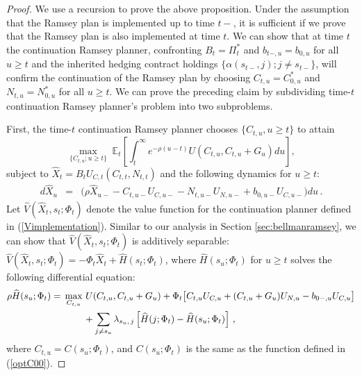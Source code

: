 \documentclass[12pt]{article}
\newcommand{\NW}[1]{{\textcolor{blue}{#1}}}
\newcommand{\WJ}[1]{{\textcolor{red}{#1}}}
\begin{document}
\begin{proof}
	We  use a  recursion to prove the above proposition. 
	Under the assumption that the Ramsey plan is implemented  up to time $t-$, it is sufficient if we prove that the Ramsey plan is also implemented at time $t$. %
	We can show that  at time $t$ the continuation Ramsey planner, confronting ${B}_t = \Pi_t^*$ and ${b}_{t-, u}=b_{0, u}$ for all $u\geq t$ and the inherited hedging contract holdings $\{ \alpha(s_{t-}, j); j\neq s_{t-}\}$, will confirm the continuation of the Ramsey plan by choosing $C_{t,u}=C_{0,u}^\ast$ and $N_{t,u}=N_{0,u}^\ast$ for all $u\geq t$. We can prove the preceding claim by subdividing time-$t$ continuation Ramsey planner's  problem into two subproblems. 
	
	
	First, the  time-$t$ continuation Ramsey planner chooses  $\{C_{t, u}, u\geq t\}$ to attain  %
	\begin{equation}\label{Vimplementation}
	\max_{\{C_{t, u}; u\geq t \}}\; 
	\mathbb{E}_t \left[	\int_t^{\infty} e^{-\rho(u-t)} U({C}_{t, u}, {C}_{t, u}+G_u) d u \right]  ,
	\end{equation} %
	subject to $\widehat{X}_t={B}_tU_{C, t}(C_{t, t}, N_{t, t})$ and the following dynamics for $u\geq t$: 
	\begin{eqnarray}\label{dyhatt}  
	d \widehat{X}_u  & = &  \big(\rho \widehat{X}_{u-}-C_{t, u-}U_{C, u-} -N_{t, u-}U_{N, u-}  +{b}_{0, u-}U_{C, u-}\big)du\,. %
	\end{eqnarray} 
	Let $\widehat{V}(\widehat{X}_t, s_t; \Phi_t)$ denote  the  value function for the continuation planner defined in (\ref{Vimplementation}). Similar to our analysis in Section \ref{sec:bellmanramsey}, we can show that $\widehat{V}(\widehat{X}_t, s_t; \Phi_t)$ is additively separable: $\widehat{V}(\widehat{X}_t, s_t; \Phi_t)= -\Phi_t \widehat{X}_t + \widehat{H}(s_t; \Phi_t)$, where $\widehat{H}(s_u; \Phi_t)$ for $u\geq t$ solves the following differential equation:%
	\begin{align}\label{HJBHtt} %
	\rho \widehat{H}(s_u; \Phi_t)  = &\;
	\max_{C_{t, u}} \, U(C_{t, u},C_{t, u}+G_u) 
	+ \Phi_t \big[C_{t, u} U_{C, u}+(C_{t, u}+G_u) U_{N, u}-b_{0-, u} U_{C, u} \big]  \notag\\
	& \quad\quad \;\,	+\sum_{j\neq s_u}\lambda_{s_u , \, j}\left[ {\widehat{H}(j; \Phi_t)}-\widehat{H}(s_u; \Phi_t) \right]\, , 
	\end{align}
	where $C_{t,u} =C(s_u; \Phi_t)$, and $C(s_u; \Phi_t)$ is  the same as the function defined in (\ref{optC00}).
	

\end{proof}
\end{document}

